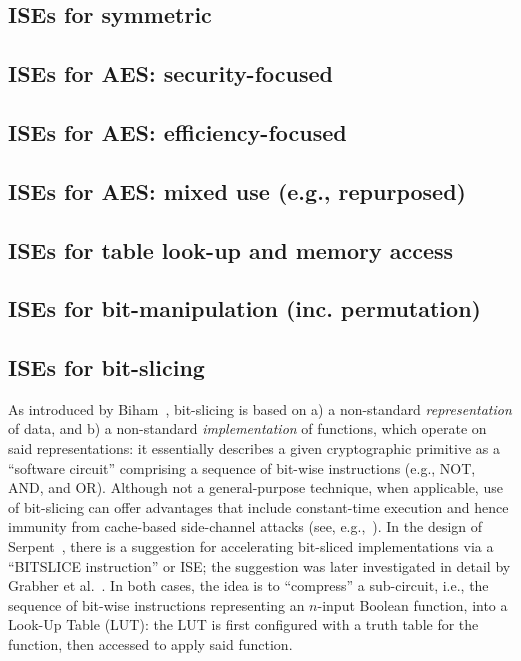 \subsection*{ISEs for symmetric}
\cite{SCARV:BurMcDAus:00,SCARV:MelElb:08,SCARV:MelElb:10,SCARV:Saarinen:19}

\subsection*{ISEs for AES: security-focused}
\cite{SCARV:TilGro:07:a}
\subsection*{ISEs for AES: efficiency-focused}
\cite{SCARV:TilGroSze:05,SCARV:TilGro:06,SCARV:APRJ:11}
\subsection*{ISEs for AES: mixed use (e.g., repurposed)}
\cite{SCARV:TilGro:05,SCARV:TilGro:07:b,SCARV:BBGR:09,SCARV:BosOzeSta:11}

\subsection*{ISEs for table look-up and memory access}
\cite{SCARV:FisLee:01,SCARV:FisLee:05:a,SCARV:FisLee:05:b,SCARV:HilYinLee:08}
\subsection*{ISEs for bit-manipulation (inc. permutation)}
\cite{SCARV:ShiLee:00,SCARV:YanLee:00,SCARV:McGLee:01,SCARV:LeeShiYan:01,SCARV:ShiLee:02,SCARV:ShiYanLee:03,SCARV:LSYRR:04,SCARV:Shi:04,MASCAB:LeeYanShi:05,SCARV:HilYinLee:08,SCARV:HilLee:08,SCARV:ShiYanLee:08,SCARV:Hilewitz:08}
\subsection*{ISEs for bit-slicing}
As introduced by Biham~\cite{SCARV:Biham:97}, bit-slicing is based on
a) a non-standard {\em representation} of data,
   and
b) a non-standard {\em implementation} of functions, which operate on
   said representations:
it essentially describes a given cryptographic primitive as a  ``software 
circuit'' comprising a sequence of bit-wise instructions (e.g., NOT, AND, 
and OR).  Although not a general-purpose technique, when applicable, use
of bit-slicing can offer advantages that include constant-time execution 
and hence immunity from cache-based side-channel attacks
(see, e.g.,~\cite{SCARV:KasSch:09}).
In the design of Serpent~\cite[Page 232]{SCARV:BihAndKnu:98}, there is a
suggestion for accelerating bit-sliced implementations via a ``BITSLICE 
instruction'' or ISE; the suggestion was later investigated in detail by 
Grabher et al.~\cite{SCARV:GraGroPag:08}.  In both cases, the idea is to 
``compress'' a sub-circuit, i.e., the sequence of bit-wise instructions 
representing an $n$-input Boolean function, into a Look-Up Table (LUT): 
the LUT is first configured with a truth table for the function, then 
accessed to apply said function.  

